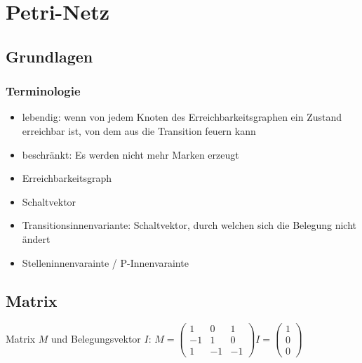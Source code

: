 \section{Petri-Netz}
\subsection{Grundlagen}
\subsubsection{Terminologie}
\begin{itemize}
	\item lebendig: wenn von jedem Knoten des Erreichbarkeitsgraphen ein Zustand erreichbar ist, von dem aus die Transition feuern kann
	\item beschränkt: Es werden nicht mehr Marken erzeugt
	\item Erreichbarkeitsgraph
	\item Schaltvektor
	\item Transitionsinnenvariante: Schaltvektor, durch welchen sich die Belegung nicht ändert
	\item Stelleninnenvarainte / P-Innenvarainte
\end{itemize}
\subsection{Matrix}
Matrix $M$ und Belegungsvektor $I$:
$
	M=\begin{pmatrix}
		1 & 0 & 1 \\
		-1 & 1 & 0 \\
		1 & -1 & -1
	\end{pmatrix}I=\begin{pmatrix}
		1 \\
		0 \\
		0
	\end{pmatrix}
$

